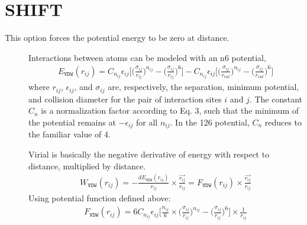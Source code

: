 \documentclass[letterpaper,10pt,english]{sphinxmanual}
\begin{document}
\section{SHIFT}
\label{\detokenize{vdw_energy:shift}}
This option forces the potential energy to be zero at  distance.
\begin{description}
\item[{}] \leavevmode
Interactions between atoms can be modeled with an n\sphinxhyphen{}6 potential,
\begin{equation*}
\begin{split}E_{\texttt{VDW}}(r_{ij}) = C_{n_{ij}} \epsilon_{ij} \bigg[\bigg(\frac{\sigma_{ij}}{r_{ij}}\bigg)^{n_{ij}} - \bigg(\frac{\sigma_{ij}}{r_{ij}}\bigg)^6\bigg] - C_{n_{ij}} \epsilon_{ij} \bigg[\bigg(\frac{\sigma_{ij}}{r_{cut}}\bigg)^{n_{ij}} - \bigg(\frac{\sigma_{ij}}{r_{cut}}\bigg)^6\bigg]\end{split}
\end{equation*}
where \(r_{ij}\), \(\epsilon_{ij}\), and \(\sigma_{ij}\) are, respectively, the separation, minimum potential, and collision diameter for the pair of interaction sites \(i\) and \(j\). The constant \(C_n\) is a normalization factor according to Eq. 3, such that the minimum of the potential remains at \(-\epsilon_{ij}\) for all \(n_{ij}\). In the 12\sphinxhyphen{}6 potential, \(C_n\) reduces to the familiar value of 4.

\item[{}] \leavevmode
Virial is basically the negative derivative of energy with respect to distance, multiplied by distance.
\begin{equation*}
\begin{split}W_{\texttt{VDW}}(r_{ij}) = -\frac{dE_{\texttt{VDW}}(r_{ij})}{r_{ij}}\times \frac{\overrightarrow{r_{ij}}}{{r_{ij}}} = F_{\texttt{VDW}}(r_{ij}) \times \frac{\overrightarrow{r_{ij}}}{{r_{ij}}}\end{split}
\end{equation*}
Using  potential function defined above:
\begin{equation*}
\begin{split}F_{\texttt{VDW}}(r_{ij}) = 6C_{n_{ij}} \epsilon_{ij} \bigg[\frac{n_{ij}}{6} \times \bigg(\frac{\sigma_{ij}}{r_{ij}}\bigg)^{n_{ij}} - \bigg(\frac{\sigma_{ij}}{r_{ij}}\bigg)^6\bigg]\times \frac{1}{{r_{ij}}}\end{split}
\end{equation*}
\begin{figure}[htbp]
\centering
\capstart


\end{figure}
\end{description}
\end{document}
